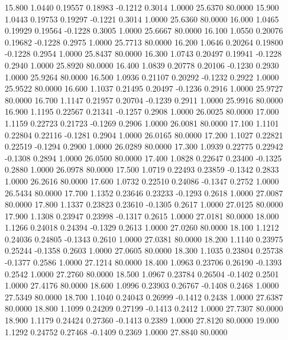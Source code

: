   15.800   1.0440   0.19557   0.18983  -0.1212   0.3014   1.0000  25.6370  80.0000
  15.900   1.0443   0.19753   0.19297  -0.1221   0.3014   1.0000  25.6360  80.0000
  16.000   1.0465   0.19929   0.19564  -0.1228   0.3005   1.0000  25.6667  80.0000
  16.100   1.0550   0.20076   0.19682  -0.1228   0.2975   1.0000  25.7713  80.0000
  16.200   1.0646   0.20264   0.19800  -0.1228   0.2954   1.0000  25.8437  80.0000
  16.300   1.0743   0.20497   0.19941  -0.1228   0.2940   1.0000  25.8920  80.0000
  16.400   1.0839   0.20778   0.20106  -0.1230   0.2930   1.0000  25.9264  80.0000
  16.500   1.0936   0.21107   0.20292  -0.1232   0.2922   1.0000  25.9522  80.0000
  16.600   1.1037   0.21495   0.20497  -0.1236   0.2916   1.0000  25.9727  80.0000
  16.700   1.1147   0.21957   0.20704  -0.1239   0.2911   1.0000  25.9916  80.0000
  16.900   1.1195   0.22567   0.21341  -0.1257   0.2908   1.0000  26.0025  80.0000
  17.000   1.1159   0.22723   0.21723  -0.1269   0.2906   1.0000  26.0081  80.0000
  17.100   1.1101   0.22804   0.22116  -0.1281   0.2904   1.0000  26.0165  80.0000
  17.200   1.1027   0.22821   0.22519  -0.1294   0.2900   1.0000  26.0289  80.0000
  17.300   1.0939   0.22775   0.22942  -0.1308   0.2894   1.0000  26.0500  80.0000
  17.400   1.0828   0.22647   0.23400  -0.1325   0.2880   1.0000  26.0978  80.0000
  17.500   1.0719   0.22493   0.23859  -0.1342   0.2833   1.0000  26.2616  80.0000
  17.600   1.0732   0.22510   0.24086  -0.1347   0.2752   1.0000  26.5434  80.0000
  17.700   1.1352   0.23646   0.23233  -0.1293   0.2618   1.0000  27.0087  80.0000
  17.800   1.1337   0.23823   0.23610  -0.1305   0.2617   1.0000  27.0125  80.0000
  17.900   1.1308   0.23947   0.23998  -0.1317   0.2615   1.0000  27.0181  80.0000
  18.000   1.1266   0.24018   0.24394  -0.1329   0.2613   1.0000  27.0260  80.0000
  18.100   1.1212   0.24036   0.24805  -0.1343   0.2610   1.0000  27.0381  80.0000
  18.200   1.1140   0.23975   0.25244  -0.1358   0.2603   1.0000  27.0605  80.0000
  18.300   1.1035   0.23804   0.25738  -0.1377   0.2586   1.0000  27.1214  80.0000
  18.400   1.0963   0.23706   0.26190  -0.1393   0.2542   1.0000  27.2760  80.0000
  18.500   1.0967   0.23784   0.26504  -0.1402   0.2501   1.0000  27.4176  80.0000
  18.600   1.0996   0.23903   0.26767  -0.1408   0.2468   1.0000  27.5349  80.0000
  18.700   1.1040   0.24043   0.26999  -0.1412   0.2438   1.0000  27.6387  80.0000
  18.800   1.1099   0.24209   0.27199  -0.1413   0.2412   1.0000  27.7307  80.0000
  18.900   1.1179   0.24424   0.27360  -0.1413   0.2389   1.0000  27.8120  80.0000
  19.000   1.1292   0.24752   0.27468  -0.1409   0.2369   1.0000  27.8840  80.0000
